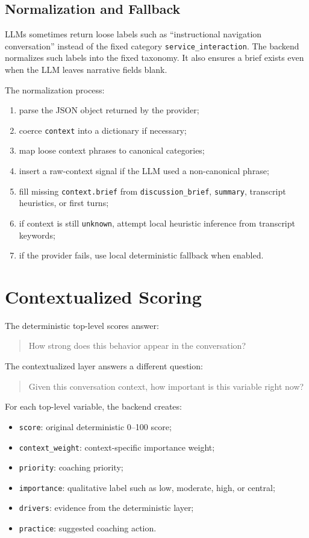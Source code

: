 \documentclass[11pt]{article}
\begin{document}
\subsection{Normalization and Fallback}

LLMs sometimes return loose labels such as ``instructional navigation conversation'' instead of the fixed category \texttt{service\_interaction}. The backend normalizes such labels into the fixed taxonomy. It also ensures a brief exists even when the LLM leaves narrative fields blank.

The normalization process:

\begin{enumerate}[leftmargin=*]
  \item parse the JSON object returned by the provider;
  \item coerce \texttt{context} into a dictionary if necessary;
  \item map loose context phrases to canonical categories;
  \item insert a raw-context signal if the LLM used a non-canonical phrase;
  \item fill missing \texttt{context.brief} from \texttt{discussion\_brief}, \texttt{summary}, transcript heuristics, or first turns;
  \item if context is still \texttt{unknown}, attempt local heuristic inference from transcript keywords;
  \item if the provider fails, use local deterministic fallback when enabled.
\end{enumerate}

\section{Contextualized Scoring}

The deterministic top-level scores answer:

\begin{quote}
How strong does this behavior appear in the conversation?
\end{quote}

The contextualized layer answers a different question:

\begin{quote}
Given this conversation context, how important is this variable right now?
\end{quote}

For each top-level variable, the backend creates:

\begin{itemize}[leftmargin=*]
  \item \texttt{score}: original deterministic 0--100 score;
  \item \texttt{context\_weight}: context-specific importance weight;
  \item \texttt{priority}: coaching priority;
  \item \texttt{importance}: qualitative label such as low, moderate, high, or central;
  \item \texttt{drivers}: evidence from the deterministic layer;
  \item \texttt{practice}: suggested coaching action.
\end{itemize}
\end{document}
